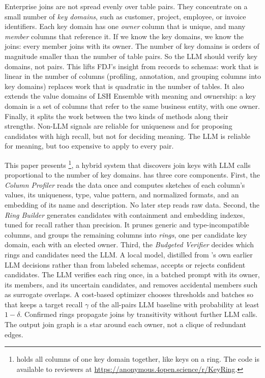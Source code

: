  Enterprise joins are not spread evenly over table pairs.
They concentrate on a small number of \emph{key domains}, such as customer, project, employee, or invoice identifiers.
Each key domain has one \emph{owner} column that is unique, and many \emph{member} columns that reference it.
If we know the key domains, we know the joins: every member joins with its owner.
The number of key domains is orders of magnitude smaller than the number of table pairs.
So the LLM should verify key domains, not pairs.
This lifts FDJ's insight from records to schemas: work that is linear in the number of columns (profiling, annotation, and grouping columns into key domains) replaces work that is quadratic in the number of tables.
It also extends the value domains of LSH Ensemble with meaning and ownership: a key domain is a set of columns that refer to the same business entity, with one owner.
Finally, it splits the work between the two kinds of methods along their strengths.
Non-LLM signals are reliable for uniqueness and for proposing candidates with high recall, but not for deciding meaning.
The LLM is reliable for meaning, but too expensive to apply to every pair.

 This paper presents \ourmethod\footnote{\ourmethod holds all columns of one key domain together, like keys on a ring. The code is available to reviewers at \url{https://anonymous.4open.science/r/KeyRing}.}, a hybrid system that discovers join keys with LLM calls proportional to the number of key domains.
\ourmethod has three core components.
First, the \emph{Column Profiler} reads the data once and computes sketches of each column's values, its uniqueness, type, value pattern, and normalized formats, and an embedding of its name and description.
No later step reads raw data.
Second, the \emph{Ring Builder} generates candidates with containment and embedding indexes, tuned for recall rather than precision.
It prunes generic and type-incompatible columns, and groups the remaining columns into \emph{rings}, one per candidate key domain, each with an elected owner.
Third, the \emph{Budgeted Verifier} decides which rings and candidates need the LLM.
A local model, distilled from \ourmethod's own earlier LLM decisions rather than from labeled schemas, accepts or rejects confident candidates.
The LLM verifies each ring once, in a batched prompt with its owner, its members, and its uncertain candidates, and removes accidental members such as surrogate overlaps.
A cost-based optimizer chooses thresholds and batches so that \ourmethod keeps a target recall $\gamma$ of the all-pairs LLM baseline with probability at least $1-\delta$.
Confirmed rings propagate joins by transitivity without further LLM calls.
The output join graph is a star around each owner, not a clique of redundant edges.

